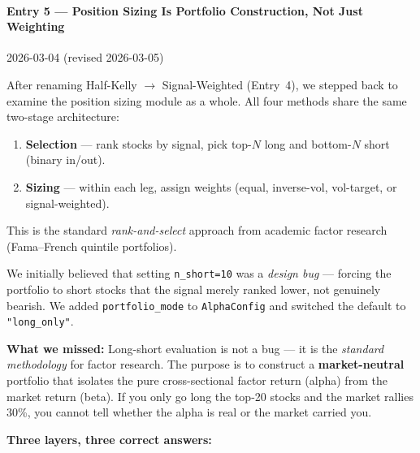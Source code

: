 \documentclass[a4paper, 11pt]{report}
\theoremstyle{definition}
\theoremstyle{remark}
\begin{document}
\paragraph{Entry 5 --- Position Sizing Is Portfolio Construction, Not Just Weighting}
\label{exp:position-sizing-landscape}
\begin{description}[style=nextline, leftmargin=1.8cm]
    \item[Date] 2026-03-04 \quad (revised 2026-03-05)

    \item[Context]
        After renaming Half-Kelly $\to$ Signal-Weighted (Entry~4),
        we stepped back to examine the position sizing module as a
        whole.  All four methods share the same two-stage architecture:

        \begin{enumerate}[nosep]
            \item \textbf{Selection} --- rank stocks by signal, pick
                  top-$N$ long and bottom-$N$ short (binary in/out).
            \item \textbf{Sizing} --- within each leg, assign weights
                  (equal, inverse-vol, vol-target, or signal-weighted).
        \end{enumerate}

        This is the standard \emph{rank-and-select} approach from
        academic factor research (Fama--French quintile portfolios).

    \item[The Long-Short Confusion (and Correction)]
        We initially believed that setting \texttt{n\_short=10} was a
        \emph{design bug} --- forcing the portfolio to short stocks
        that the signal merely ranked lower, not genuinely bearish.
        We added \texttt{portfolio\_mode} to \texttt{AlphaConfig} and
        switched the default to \texttt{"long\_only"}.

        \medskip
        \textbf{What we missed:}  Long-short evaluation is not a bug
        --- it is the \emph{standard methodology} for factor research.
        The purpose is to construct a \textbf{market-neutral} portfolio
        that isolates the pure cross-sectional factor return (alpha)
        from the market return (beta).  If you only go long the top-20
        stocks and the market rallies 30\%, you cannot tell whether the
        alpha is real or the market carried you.

        \medskip
        \textbf{Three layers, three correct answers:}


\end{description}
\end{document}
